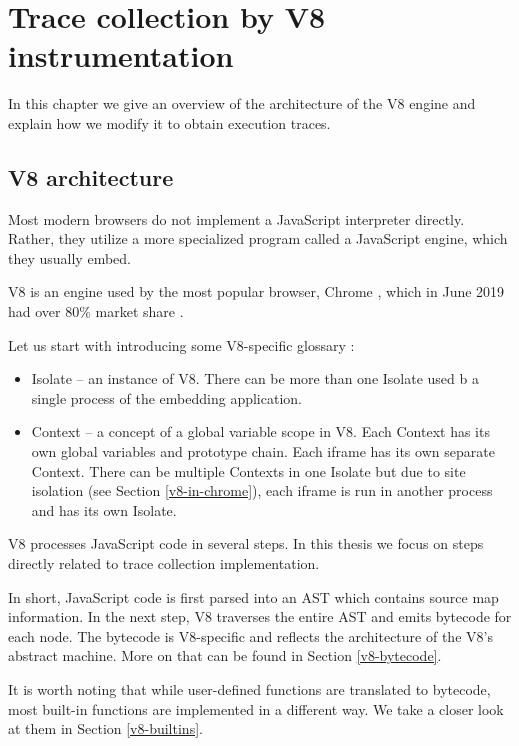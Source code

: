 \chapter{Trace collection by V8 instrumentation}
\label{v8-instrumentation}

In this chapter we give an overview of the architecture of the V8 engine
and explain how we modify it to obtain execution traces.

\section{V8 architecture}
Most modern browsers do not implement a JavaScript interpreter directly. Rather, they utilize a more
specialized program called a JavaScript engine, which they usually embed. 

V8 is an engine used by the most popular browser, Chrome \cite{v8:main-page}, which in June 2019 
had over 80\% market share  \cite{w3:browsers}.

Let us start with introducing some V8-specific glossary \cite{v8:bindings}:
\begin{itemize}
  \item Isolate -- an instance of V8. There can be more than one Isolate used b a single process of the embedding application.
  \item Context -- a concept of a global variable scope in V8. Each Context has its own global variables and prototype chain.
           Each iframe has its own separate Context. There can be multiple Contexts in one Isolate but due to site isolation 
           (see Section \ref{v8-in-chrome}), each iframe is run in another process and has its own Isolate.
\end{itemize}

V8 processes JavaScript code in several steps. In this thesis we focus on steps
directly related to trace collection implementation.

In short, JavaScript code is first parsed into an AST which contains source map information. 
In the next step, V8 traverses the entire AST and emits bytecode for each node.
The bytecode is V8-specific and reflects the architecture of the V8's abstract machine.
More on that can be found in Section \ref{v8-bytecode}.

It is worth noting that while user-defined functions are translated to bytecode,
most built-in functions are implemented in a different way. We take a closer look at them
in Section \ref{v8-builtins}.

